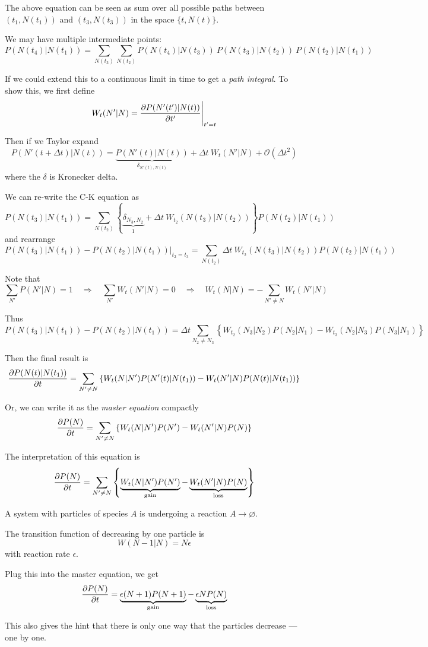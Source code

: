 \documentclass[a4paper,11pt]{article}
\begin{document}
	The above equation can be seen as sum over all possible paths between $(t_1, N(t_1))$ and $(t_3, N(t_3))$ in the space $\{t, N(t)\}$.

	We may have multiple intermediate points:
	\begin{equation}
		P(N(t_4)| N(t_1)) = \sum_{N(t_3)} \sum_{N(t_2)} P(N(t_4)|N(t_3))\ P(N(t_3)|N(t_2))\ P(N(t_2)|N(t_1))
	\end{equation}

	If we could extend this to a continuous limit in time to get a \emph{path integral}. To show this, we first define
	\[
		W_t (N'|N) = \pdv{P(N'(t')|N(t))}{t'}\Bigg|_{t' = t}
	\]

	Then if we Taylor expand
	\[
		P(N'(t + \Delta t)|N(t)) = \underbrace{P(N'(t)|N(t))}_{\delta_{N'(t),N(t)}} + \Delta t\ W_t(N'|N) + \mathcal{O}(\Delta t^2)
	\]
	where the $\delta$ is Kronecker delta.

	We can re-write the C-K equation as 
	\[
		P(N(t_3)| N(t_1)) = \sum_{N(t_2)} \left\{\underbrace{\delta_{N_3,N_2}}_{1} + \Delta t\ W_{t_2}(N(t_3)|N(t_2)) \right\} P(N(t_2)|N(t_1))
	\]
	and rearrange
	\[
		P(N(t_3)|N(t_1)) - P(N(t_2)|N(t_1))\big|_{t_2 = t_3} = \sum_{N(t_2)} \Delta t\ W_{t_2}(N(t_3)|N(t_2))  P(N(t_2)|N(t_1))
	\]
	
	Note that
	\[
		\sum_{N'} P(N'|N) = 1 \quad \Rightarrow\quad \sum_{N'} W_t (N' | N) = 0 \quad \Rightarrow\quad W_t(N|N) = - \sum_{N' \neq N} W_t (N' | N)
	\]
	
	Thus
	\[
		P(N(t_3)|N(t_1)) - P(N(t_2)|N(t_1)) = \Delta t \sum_{N_2 \neq N_3} \left\{ W_{t_2}(N_3|N_2) P (N_2 | N_1) - W_{t_3}(N_2 | N_3)P(N_3|N_1)\right\}
	\]

	Then the final result is
	\begin{equation}
		\pdv{P(N(t) | N(t_1))}{t} = \sum_{N' \neq N} \left\{ W_t(N | N')P(N'(t) | N(t_1)) - W_t (N' | N)P(N(t) | N(t_1))\right\}
	\end{equation}

	Or, we can write it as the \emph{master equation} compactly
	\begin{equation}
		\pdv{P(N)}{t} = \sum_{N' \neq N} \left\{ W_t (N | N')P(N') - W_t(N'|N)P(N)\right\}
	\end{equation}

	The interpretation of this equation is
	\[
		\pdv{P(N)}{t} = \sum_{N' \neq N} \left\{ \underbrace{W_t (N | N')P(N')}_{\text{gain}} - \underbrace{W_t(N'|N)P(N)}_{\text{loss}}\right\}
	\]

	\begin{ex}[Extinction]
		A system with particles of species $A$ is undergoing a reaction $A \to \varnothing$.

		The transition function of decreasing by one particle is \[
			W(N-1|N) = N \epsilon
		\]
		with reaction rate $\epsilon$.

		Plug this into the master equation, we get
		\[
			\pdv{P(N)}{t} = \underbrace{\epsilon (N+1) P(N+1)}_{\text{gain}} - \underbrace{\epsilon N P(N)}_{\text{loss}}
		\]
		
		This also gives the hint that there is only one way that the particles decrease --- one by one.
	\end{ex}
	
	
	
\end{document}
